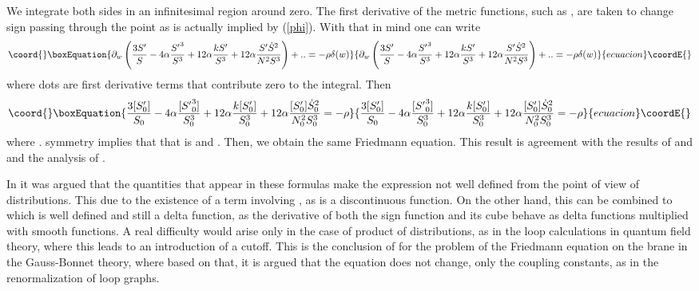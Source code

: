 \documentclass[a4paper,a4paper]{article}
\begin{document}
We integrate both sides
in an infinitesimal region around zero. The first derivative of the metric functions, such as
\myHighlight{$\varphi$}\coordHE{}, are taken to change sign passing through the point \coordHE{} as is actually implied by
(\ref{phi}). With that in mind one can write
\begin{equation}\coord{}\boxEquation{
\partial_w \left(\frac{3S'}{S}- 4 \alpha \frac{  {S'}^3}{S^3}
 +   12 \alpha \frac{ k S'}{S^3}
+ 12 \alpha \frac{S' \dot S^2}{N^2S^3} \right)+..=- \rho \delta(w)
}{
\partial_w \left(\frac{3S'}{S}- 4 \alpha \frac{  {S'}^3}{S^3}
 +   12 \alpha \frac{ k S'}{S^3}
+ 12 \alpha \frac{S' \dot S^2}{N^2S^3} \right)+..=- \rho \delta(w)
}{ecuacion}\coordE{}\end{equation}
where dots are first derivative terms that contribute zero to the integral. Then
\begin{equation}\coord{}\boxEquation{ \label{dis}
\frac{3[S_0']}{S_0}- 4 \alpha \frac{  [{S'}_0^3]}{S_0^3}+
 12 \alpha  \frac{ k [S_0']}{S^3_0}+ 12 \alpha \frac{ [S_0'] \dot S_0^2}{N_0^2S_0^3}=-\rho
}{ \frac{3[S_0']}{S_0}- 4 \alpha \frac{  [{S'}_0^3]}{S_0^3}+
 12 \alpha  \frac{ k [S_0']}{S^3_0}+ 12 \alpha \frac{ [S_0'] \dot S_0^2}{N_0^2S_0^3}=-\rho
}{ecuacion}\coordE{}\end{equation}
where  \coordHE{}. \coordHE{} symmetry 
implies that \coordHE{} 
that is \coordHE{} and
\coordHE{}. Then, we obtain the same Friedmann equation. This result is
agreement with the results of \coordHE{} 
and \coordHE{} and the analysis of \coordHE{}.

In \coordHE{} it was argued that the quantities that appear in these formulas
make the expression not well defined from the point of view of distributions. This due to 
the existence of a term involving \coordHE{}, as \coordHE{} is a discontinuous function. On the
other hand, this can be combined to \coordHE{} which is well defined and
still a delta function, as the derivative of both the sign function and its cube behave as
delta functions multiplied with smooth functions. A real difficulty would arise only 
in the case of product of distributions, as in the loop calculations in quantum field theory,
where this leads to an introduction of a cutoff. This is the conclusion of \coordHE{}
for the problem of the Friedmann equation on the brane in the Gauss-Bonnet theory, where
based on that, it is argued that the equation does not change, only the coupling constants, as
in the renormalization of loop graphs.
\end{document}
